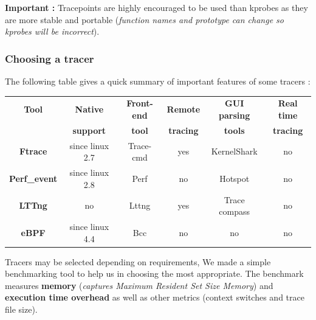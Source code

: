 \textbf{\color{orange}Important : } Tracepoints are highly encouraged to be used than kprobes as they are more stable and portable (\textit{function names and prototype can change so kprobes will be incorrect}).
\subsubsection{Choosing a tracer}
The following table gives a quick summary of important features of some tracers :
\begin{center}
	\begin{tabular}{|c|c|c|c|c|c|}
		\hline
			\rowcolor{LightCyan}
			\textbf{Tool} & \textbf{Native} & \textbf{Front-end} & \textbf{Remote} & \textbf{GUI parsing} & \textbf{Real time} \\	
						\rowcolor{LightCyan}   
			 & \textbf{support} & \textbf{tool} & \textbf{tracing} & \textbf{tools} & \textbf{tracing} \\	 		
   		\hline
	    	\textbf{Ftrace} & since linux 2.7 & Trace-cmd & yes & KernelShark & no \\
	    \hline
	    	\textbf{Perf\_event} & since linux 2.8 & Perf & no & Hotspot & no \\
		\hline     
        	\textbf{LTTng} & no & Lttng & yes & Trace compass & no \\
		\hline     
        	\textbf{eBPF} & since linux 4.4 & Bcc & no & no & no \\
   		\hline
	\end{tabular}
\end{center}

Tracers may be selected depending on requirements, We made a simple benchmarking tool to help us in choosing the most appropriate. The benchmark measures \textbf{memory} (\textit{captures Maximum Resident Set Size Memory}) and \textbf{execution time overhead} as well as other metrics (context switches and trace file size).

\begin{center}
\end{center}


